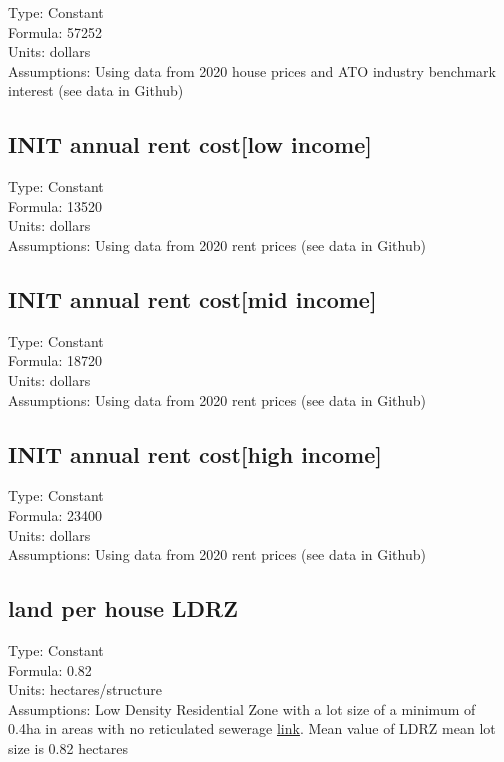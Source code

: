 \documentclass[
  11pt,
]{book}
\begin{document}
Type: Constant\\
Formula: 57252\\
Units: dollars\\
Assumptions: Using data from 2020 house prices and ATO industry benchmark interest (see data in Github)

\hypertarget{init-annual-rent-costlow-income}{%
\subsection{INIT annual rent cost{[}low income{]}}\label{init-annual-rent-costlow-income}}

Type: Constant\\
Formula: 13520\\
Units: dollars\\
Assumptions: Using data from 2020 rent prices (see data in Github)

\hypertarget{init-annual-rent-costmid-income}{%
\subsection{INIT annual rent cost{[}mid income{]}}\label{init-annual-rent-costmid-income}}

Type: Constant\\
Formula: 18720\\
Units: dollars\\
Assumptions: Using data from 2020 rent prices (see data in Github)

\hypertarget{init-annual-rent-costhigh-income}{%
\subsection{INIT annual rent cost{[}high income{]}}\label{init-annual-rent-costhigh-income}}

Type: Constant\\
Formula: 23400\\
Units: dollars\\
Assumptions: Using data from 2020 rent prices (see data in Github)

\hypertarget{land-per-house-ldrz-1}{%
\subsection{land per house LDRZ}\label{land-per-house-ldrz-1}}

Type: Constant\\
Formula: 0.82\\
Units: hectares/structure\\
Assumptions: Low Density Residential Zone with a lot size of a minimum of 0.4ha in areas with no reticulated sewerage \href{https://www.planning.vic.gov.au/__data/assets/pdf_file/0026/97172/PPN37-Rural-Residential-Development_June-2015.pdf}{link}. Mean value of LDRZ mean lot size is 0.82 hectares
\end{document}
